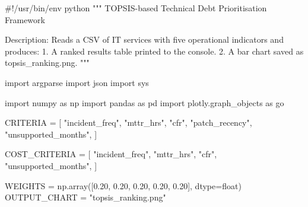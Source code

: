 \documentclass[
  12pt,
  letterpaper,
  12pt,
  oneside,
  english,
  onehalfspacing,
  headsepline]{MastersDoctoralThesis}
\newenvironment{Shaded}{\begin{snugshade}}{\end{snugshade}}
\newcommand{\BuiltInTok}[1]{\textcolor[rgb]{0.00,0.23,0.31}{#1}}
\newcommand{\CommentTok}[1]{\textcolor[rgb]{0.37,0.37,0.37}{#1}}
\newcommand{\FloatTok}[1]{\textcolor[rgb]{0.68,0.00,0.00}{#1}}
\newcommand{\ImportTok}[1]{\textcolor[rgb]{0.00,0.46,0.62}{#1}}
\newcommand{\NormalTok}[1]{\textcolor[rgb]{0.00,0.23,0.31}{#1}}
\newcommand{\OperatorTok}[1]{\textcolor[rgb]{0.37,0.37,0.37}{#1}}
\newcommand{\StringTok}[1]{\textcolor[rgb]{0.13,0.47,0.30}{#1}}
\begin{document}
\begin{Shaded}
\begin{Highlighting}[]
\CommentTok{\#!/usr/bin/env python}
\CommentTok{"""}
\CommentTok{TOPSIS{-}based Technical Debt Prioritisation Framework}

\CommentTok{Description: Reads a CSV of IT services with five operational indicators and produces:}
\CommentTok{  1. A ranked results table printed to the console.}
\CommentTok{  2. A bar chart saved as topsis\_ranking.png.}
\CommentTok{"""}

\ImportTok{import}\NormalTok{ argparse}
\ImportTok{import}\NormalTok{ json}
\ImportTok{import}\NormalTok{ sys}

\ImportTok{import}\NormalTok{ numpy }\ImportTok{as}\NormalTok{ np}
\ImportTok{import}\NormalTok{ pandas }\ImportTok{as}\NormalTok{ pd}
\ImportTok{import}\NormalTok{ plotly.graph\_objects }\ImportTok{as}\NormalTok{ go}

\NormalTok{CRITERIA }\OperatorTok{=}\NormalTok{ [}
    \StringTok{"incident\_freq"}\NormalTok{,}
    \StringTok{"mttr\_hrs"}\NormalTok{,}
    \StringTok{"cfr"}\NormalTok{,}
    \StringTok{"patch\_recency"}\NormalTok{,}
    \StringTok{"unsupported\_months"}\NormalTok{,}
\NormalTok{]}

\NormalTok{COST\_CRITERIA }\OperatorTok{=}\NormalTok{ [}
    \StringTok{"incident\_freq"}\NormalTok{,}
    \StringTok{"mttr\_hrs"}\NormalTok{,}
    \StringTok{"cfr"}\NormalTok{,}
    \StringTok{"unsupported\_months"}\NormalTok{,}
\NormalTok{]}

\NormalTok{WEIGHTS }\OperatorTok{=}\NormalTok{ np.array([}\FloatTok{0.20}\NormalTok{, }\FloatTok{0.20}\NormalTok{, }\FloatTok{0.20}\NormalTok{, }\FloatTok{0.20}\NormalTok{, }\FloatTok{0.20}\NormalTok{], dtype}\OperatorTok{=}\BuiltInTok{float}\NormalTok{)}
\NormalTok{OUTPUT\_CHART }\OperatorTok{=} \StringTok{"topsis\_ranking.png"}
\end{Highlighting}
\end{Shaded}
\end{document}
